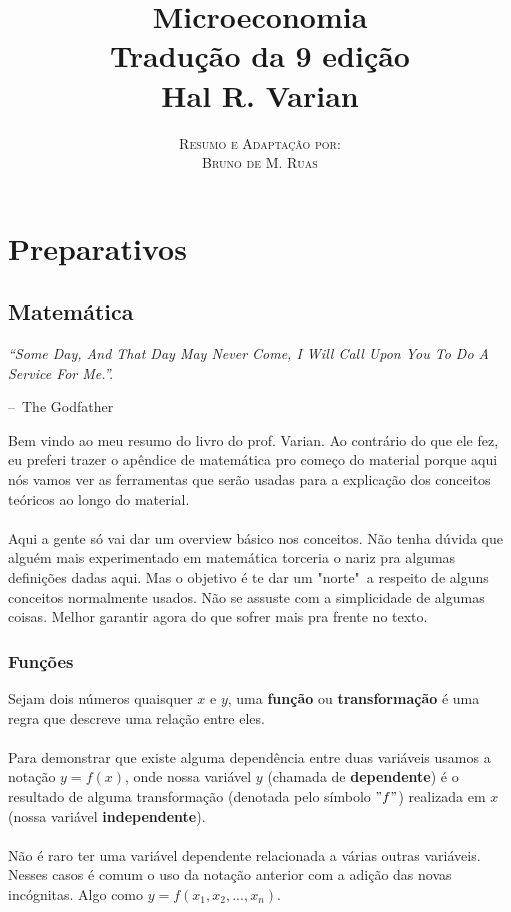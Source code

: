 \documentclass[a4paper,11pt,oneside]{book}
\title{\Huge \textbf{Microeconomia} \\ 
\Large Tradução da 9 edição \\
\huge Hal R. Varian}
\author{
\textsc{Resumo e Adaptação por:} \\
\textsc{Bruno de M. Ruas}
}
\makeatletter
\theoremstyle{definition}
\theoremstyle{break}
\newenvironment{chapquote}[2][2em]
  {\setlength{\@tempdima}{#1}%
   \def\chapquote@author{#2}%
   \parshape 1 \@tempdima \dimexpr\textwidth-2\@tempdima\relax%
   \itshape}
  {\par\normalfont\hfill--\ \chapquote@author\hspace*{\@tempdima}\par\bigskip}
\makeatother
\begin{document}
\frontmatter
\maketitle

\tableofcontents

\mainmatter

\part*{Preparativos}

\chapter*{Matemática}

\begin{chapquote}{The Godfather}
	``Some Day, And That Day May Never Come, I Will Call Upon You To Do A Service For Me.''.
\end{chapquote}

Bem vindo ao meu resumo do livro do prof. Varian. Ao contrário do que ele fez, eu preferi trazer o apêndice de matemática pro começo do material porque aqui nós vamos ver as ferramentas que serão usadas para a explicação dos conceitos teóricos ao longo do material.
\\
\\
Aqui a gente só vai dar um overview básico nos conceitos. Não tenha dúvida que alguém mais experimentado em matemática torceria o nariz pra algumas definições dadas aqui. Mas o objetivo é te dar um "norte"\ a respeito de alguns conceitos normalmente usados. Não se assuste com a simplicidade de algumas coisas. Melhor garantir agora do que sofrer mais pra frente no texto.

\section*{Funções}

Sejam dois números quaisquer $x$ e $y$, uma \textbf{função} ou \textbf{transformação} é uma regra que descreve uma relação entre eles.
\\
\\
Para demonstrar que existe alguma dependência entre duas variáveis usamos a notação $y = f(x)$, onde nossa variável $y$ (chamada de \textbf{dependente}) é o resultado de alguma transformação (denotada pelo símbolo $"f"$) realizada em $x$ (nossa variável \textbf{independente}).
\\
\\
Não é raro ter uma variável dependente relacionada a várias outras variáveis. Nesses casos é comum o uso da notação anterior com a adição das novas incógnitas. Algo como $y = f(x_1,x_2,...,x_n)$.
\end{document}
